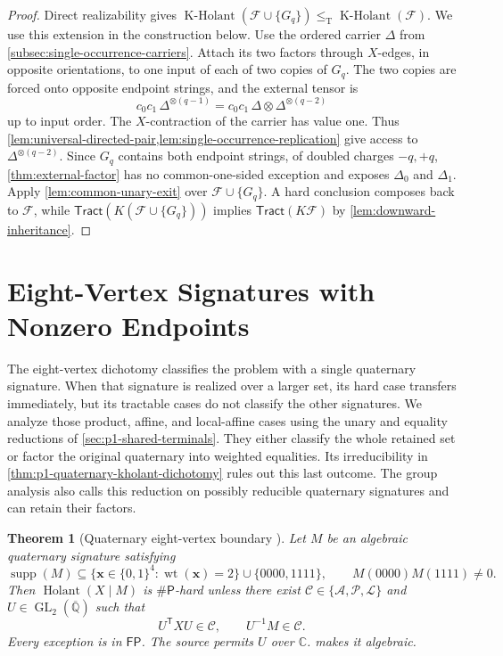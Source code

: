 \documentclass[11pt,letterpaper,onecolumn]{article}
\theoremstyle{plain}
\newtheorem{theorem}{Theorem}[section]
\theoremstyle{definition}
\theoremstyle{remark}
\newcommand{\AlgNums}{\overline{\mathbb Q}}
\newcommand{\cF}{\mathcal F}
\newcommand{\cA}{\mathscr A}
\newcommand{\cP}{\mathscr P}
\newcommand{\cL}{\mathscr L}
\newcommand{\cC}{\mathscr C}
\newcommand{\Holant}{\operatorname{Holant}}
\newcommand{\KHolant}{\operatorname{K\text{-}Holant}}
\newcommand{\Tract}{\mathsf{Tract}}
\newcommand{\FP}{\mathsf{FP}}
\newcommand{\SharpP}{\#\mathsf P}
\newcommand{\GL}{\operatorname{GL}}
\newcommand{\wt}{\operatorname{wt}}
\newcommand{\supp}{\operatorname{supp}}
\newcommand{\DeltaZero}{\Delta_0}
\newcommand{\DeltaOne}{\Delta_1}
\newcommand{\leT}{\leq_{\mathrm T}}
\begin{document}
\begin{proof}
Direct realizability gives
\(\KHolant(\cF\cup\{G_q\})\leT\KHolant(\cF)\).
We use this extension in the construction below.
Use the ordered carrier \(\Delta\) from
\cref{subsec:single-occurrence-carriers}.  Attach its
two factors through \(X\)-edges, in opposite orientations, to one input
of each of two copies of \(G_q\).  The two copies are forced onto opposite
endpoint strings, and the external tensor is
\[
  c_0c_1\,\Delta^{\otimes(q-1)}
  =
  c_0c_1\,\Delta\otimes\Delta^{\otimes(q-2)}
\]
up to input order.  The \(X\)-contraction of the carrier has value one.
Thus \cref{lem:universal-directed-pair,lem:single-occurrence-replication}
give access to \(\Delta^{\otimes(q-2)}\).  Since \(G_q\) contains
both endpoint strings, of doubled charges \(-q,+q\),
\cref{thm:external-factor} has no common-one-sided
exception and exposes \(\DeltaZero\) and \(\DeltaOne\).  Apply
\cref{lem:common-unary-exit} over \(\cF\cup\{G_q\}\).  A hard conclusion composes
back to \(\cF\), while
\(\Tract(K(\cF\cup\{G_q\}))\) implies \(\Tract(K\cF)\) by
\cref{lem:downward-inheritance}.
\end{proof}
\section{Eight-Vertex Signatures with Nonzero Endpoints}
\label{sec:p1-eight-vertex}

The eight-vertex dichotomy classifies the problem with a single
quaternary signature. When that signature is realized over a larger set,
its hard case transfers immediately, but its tractable cases do not
classify the other signatures. We analyze those product, affine, and
local-affine cases using the unary and equality reductions of
\cref{sec:p1-shared-terminals}. They either classify the whole retained
set or factor the original quaternary into weighted equalities. Its
irreducibility in \cref{thm:p1-quaternary-kholant-dichotomy} rules out
this last outcome. The group analysis also calls this reduction on
possibly reducible quaternary signatures and can retain their factors.

\begin{theorem}[Quaternary eight-vertex boundary
{\cite[arXiv version~2, Theorem~3.1]{CaiFu2023}}]
\label{thm:external-eight-vertex}
Let \(M\) be an algebraic quaternary signature satisfying
\[
 \supp(M)\subseteq\{{\mathbf{x}}\in\{0,1\}^4:\wt({\mathbf{x}})=2\}\cup\{0000,1111\},\qquad
 M(0000)M(1111)\ne0.
\]
Then \(\Holant(X\mid M)\) is \(\SharpP\)-hard unless there exist
\(\cC\in\{\cA,\cP,\cL\}\) and \(U\in\GL_2(\AlgNums)\) such that
\[
  U^{\mathsf T}XU\in\cC,\qquad U^{-1}M\in\cC.
\]
Every exception is in \(\FP\).  The source permits \(U\) over \(\mathbb C\).
 makes it algebraic.
\end{theorem}
\end{document}
